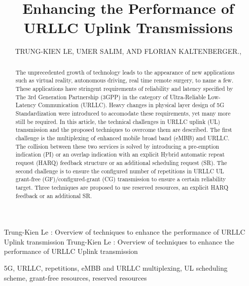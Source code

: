 \documentclass{ieeeaccess}
\begin{document}

\title{Enhancing the Performance of URLLC Uplink Transmissions}
\author{\uppercase{Trung-Kien Le},
\uppercase{Umer Salim, and Florian Kaltenberger}.,
}
\address[1]{EURECOM, Sophia Anitpolis, France (e-mail: author@eurecom.fr)}
\address[2]{TCL Mobile, Sophia Antipolis, France (e-mail: author@tcl.com)}


\markboth
{Trung-Kien Le \headeretal: Overview of techniques to enhance the performance of URLLC Uplink transmission}
{Trung-Kien Le \headeretal: Overview of techniques to enhance the performance of URLLC Uplink transmission}


\begin{abstract}
The unprecedented growth of technology leads to the appearance of new applications such as virtual reality, autonomous driving, real time remote surgery, to name a few. These applications have stringent requirements of reliability and latency specified by The 3rd Generation Partnership (3GPP) in the category of Ultra-Reliable Low-Latency Communication (URLLC). Heavy changes in physical layer design of 5G Standardization were introduced to accomodate these requirements, yet many more still be required. In this article, the technical challenges in URLLC uplink (UL) transmission and the proposed techniques to overcome them are described. The first challenge is the multiplexing of enhanced mobile broad band (eMBB) and URLLC. The collision between these two services is solved by introducing a pre-emption indication (PI) or an overlap indication with an explicit Hybrid automatic repeat request (HARQ) feedback structure or an additional scheduling request (SR). The second challenge is to ensure the configured number of repetitions in URLLC UL grant-free (GF)/configured-grant (CG) transmission to ensure a certain reliability target. Three techniques are proposed to use reserved resources, an explicit HARQ feedback or an additional SR.
\end{abstract}

\begin{keywords}
5G, URLLC, repetitions, eMBB and URLLC multiplexing, UL scheduling scheme, grant-free resources, reserved resources
\end{keywords}
\end{document}
